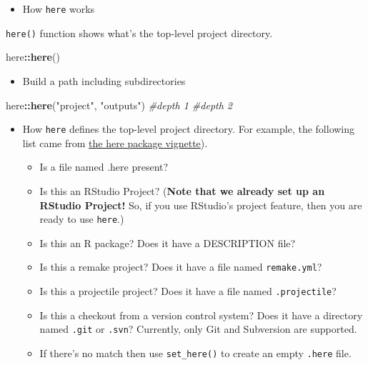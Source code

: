 \documentclass[
]{book}
\newenvironment{Shaded}{\begin{snugshade}}{\end{snugshade}}
\newcommand{\CommentTok}[1]{\textcolor[rgb]{0.56,0.35,0.01}{\textit{#1}}}
\newcommand{\KeywordTok}[1]{\textcolor[rgb]{0.13,0.29,0.53}{\textbf{#1}}}
\newcommand{\NormalTok}[1]{#1}
\newcommand{\OperatorTok}[1]{\textcolor[rgb]{0.81,0.36,0.00}{\textbf{#1}}}
\newcommand{\StringTok}[1]{\textcolor[rgb]{0.31,0.60,0.02}{#1}}
\providecommand{\tightlist}{%
  \setlength{\itemsep}{0pt}\setlength{\parskip}{0pt}}
\begin{document}
\begin{itemize}
\tightlist
\item
  How \texttt{here} works
\end{itemize}

\texttt{here()} function shows what's the top-level project directory.

\begin{Shaded}
\begin{Highlighting}[]
\NormalTok{here}\OperatorTok{::}\KeywordTok{here}\NormalTok{()}
\end{Highlighting}
\end{Shaded}

\begin{itemize}
\tightlist
\item
  Build a path including subdirectories
\end{itemize}

\begin{Shaded}
\begin{Highlighting}[]
\NormalTok{here}\OperatorTok{::}\KeywordTok{here}\NormalTok{(}\StringTok{"project"}\NormalTok{, }\StringTok{"outputs"}\NormalTok{)}
           \CommentTok{\#depth 1   \#depth 2}
\end{Highlighting}
\end{Shaded}

\begin{itemize}
\item
  How \texttt{here} defines the top-level project directory. For example, the following list came from \href{https://GitHub.com/jennybc/here_here}{the here package vignette}).

  \begin{itemize}
  \item
    Is a file named .here present?
  \item
    Is this an RStudio Project? (\textbf{Note that we already set up an RStudio Project!} So, if you use RStudio's project feature, then you are ready to use \texttt{here}.)
  \item
    Is this an R package? Does it have a DESCRIPTION file?
  \item
    Is this a remake project? Does it have a file named \texttt{remake.yml}?
  \item
    Is this a projectile project? Does it have a file named \texttt{.projectile}?
  \item
    Is this a checkout from a version control system? Does it have a directory named \texttt{.git} or \texttt{.svn}? Currently, only Git and Subversion are supported.
  \item
    If there's no match then use \texttt{set\_here()} to create an empty \texttt{.here} file.
  \end{itemize}
\end{itemize}
\end{document}
